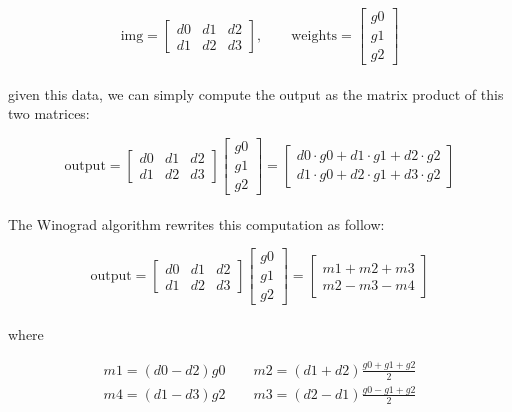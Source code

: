 \documentclass[12pt,a4paper]{report}
\begin{document}
\begin{equation}
\mbox{img} = \left[
\begin{array}{ccc}
d0 & d1 & d2 \\
d1 & d2 & d3
\end{array}
\right],
\quad\quad
\mbox{weights} = \left[
\begin{array}{c}
g0 \\
g1 \\
g2
\end{array}
\right]
\end{equation}
\\
given this data, we can simply compute the output as the matrix product of this two matrices:

\begin{equation}
\mbox{output} = \left[
\begin{array}{ccc}
d0 & d1 & d2 \\
d1 & d2 & d3
\end{array}
\right]
\left[
\begin{array}{c}
g0 \\
g1 \\
g2
\end{array}
\right] = \left[
\begin{array}{c}
d0 \cdot g0 + d1 \cdot g1 + d2 \cdot g2 \\
d1 \cdot g0 + d2 \cdot g1 + d3 \cdot g2 
\end{array}
\right]
\end{equation}
\\
The Winograd algorithm rewrites this computation as follow:

\begin{equation}
\mbox{output} = \left[
\begin{array}{ccc}
d0 & d1 & d2 \\
d1 & d2 & d3
\end{array}
\right]
\left[
\begin{array}{c}
g0 \\
g1 \\
g2
\end{array}
\right] = \left[
\begin{array}{c}
m1 + m2 + m3 \\
m2 - m3 - m4
\end{array}
\right]
\end{equation}
\\
where

\begin{equation}
\begin{aligned}
m1 = (d0 - d2)g0\quad\quad m2 = (d1 + d2)\frac{g0 + g1 + g2}{2}
\\
m4 = (d1 - d3)g2\quad\quad m3 = (d2 - d1)\frac{g0 - g1 + g2}{2}
\end{aligned}
\end{equation}
\end{document}
